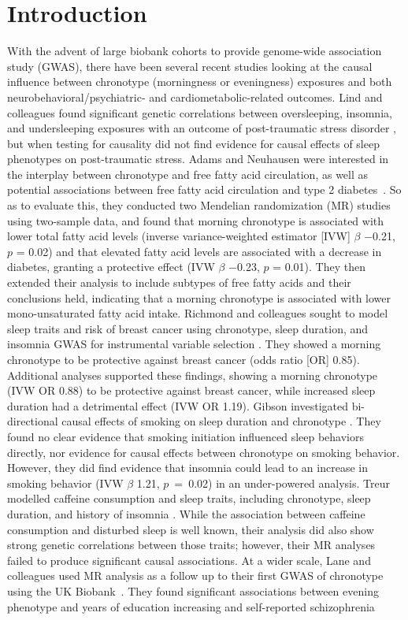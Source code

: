 \documentclass[genes,article,accept,moreauthors,pdftex]{Definitions/mdpi}
\begin{document}
\section{Introduction}

With the advent of large biobank cohorts to provide genome-wide association study (GWAS), there have been several recent studies looking at the causal influence between chronotype (morningness or eveningness) exposures and both neurobehavioral/psychiatric- and cardiometabolic-related outcomes. Lind and colleagues found significant genetic correlations between oversleeping, insomnia, and undersleeping exposures with an outcome of post-traumatic stress disorder \cite{lind_molecular_2020}, but when testing for causality did not find evidence for causal effects of sleep phenotypes on post-traumatic stress. Adams and Neuhausen were interested in the interplay between chronotype and free fatty acid circulation, as well as potential associations  between free fatty acid circulation and type 2 diabetes~\cite{adams_evaluating_2019}. So as to evaluate this, they conducted two Mendelian randomization (MR) studies using two-sample data, and found that morning chronotype is associated with lower total fatty acid levels (inverse variance-weighted estimator [IVW] $\beta$ $-$0.21, $p$ = 0.02) and that elevated fatty acid levels are associated with a decrease in diabetes, granting a protective effect (IVW $\beta$ $-$0.23, $p$ = 0.01). They then extended their analysis to include subtypes of free fatty acids and their conclusions held, indicating that a morning chronotype is associated with lower mono-unsaturated fatty acid intake. Richmond and colleagues sought to model sleep traits and risk of breast cancer using chronotype, sleep duration, and insomnia GWAS for instrumental variable selection \cite{richmond_investigating_2019}. They showed a morning chronotype to be protective against breast cancer (odds ratio [OR] 0.85). Additional analyses supported these findings, showing a morning chronotype (IVW OR 0.88) to be protective against breast cancer, while increased sleep duration had a detrimental effect (IVW OR 1.19). Gibson investigated bi-directional causal effects of smoking on sleep duration and chronotype \cite{gibson_evidence_2019}. They found no clear evidence that smoking initiation influenced sleep behaviors directly, nor evidence for causal effects between chronotype on smoking behavior. However, they did find evidence that insomnia could lead to an increase in smoking behavior (IVW $\beta$ 1.21, \mbox{$p$ = 0.02}) in an under-powered analysis. Treur modelled caffeine consumption and sleep traits, including chronotype, sleep duration, and history of insomnia \cite{treur_investigating_2018}. While the association between caffeine consumption and disturbed sleep is well known, their analysis did also show strong genetic correlations between those traits; however, their MR analyses failed to produce significant causal associations. At a wider scale, Lane and colleagues used MR analysis as a follow up to their first GWAS of chronotype using the UK Biobank~\cite{lane_genome-wide_2016}. They found significant associations between evening phenotype and years of education increasing and self-reported schizophrenia 
\end{document}
